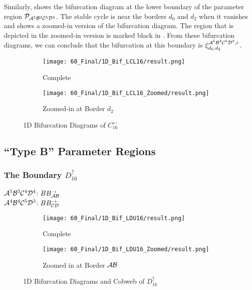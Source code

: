 Similarly,  shows the bifurcation diagram at the lower boundary of the parameter region $\mathcal{P}_{\mathcal{A}^5\mathcal{B}^3\mathcal{C}^5\mathcal{D}^3}$.
The stable cycle is near the borders $d_0$ and $d_2$ when it vanishes and  shows a zoomed-in version of the bifurcation diagram.
The region that is depicted in the zoomed-in version is marked black in .
From these bifurcation diagrams, we can conclude that the bifurcation at this boundary is $\xi_{d_0, d_2}^{\mathcal{A}^5\mathcal{B}^3\mathcal{C}^5\mathcal{D}^3, r}$.

\begin{figure}
    \centering
    \begin{subfigure}{0.4\textwidth}
        \centering
        \texttt{[image: 60\_Final/1D\_Bif\_LCL16/result.png]}
        \caption{Complete}
        \label{fig:final.bifurcation.C.left}
    \end{subfigure}
    \begin{subfigure}{0.4\textwidth}
        \centering
        \texttt{[image: 60\_Final/1D\_Bif\_LCL16\_Zoomed/result.png]}
        \caption{Zoomed-in at Border $d_2$}
        \label{fig:final.bifurcation.C.left.zoomed}
    \end{subfigure}
    \caption{1D Bifurcation Diagrams of $C_{16}^\leftarrow$}
\end{figure}

\subsection{``Type B'' Parameter Regions}

\subsubsection{The Boundary $D_{16}^\uparrow$}

$\mathcal{A}^5\mathcal{B}^3\mathcal{C}^4\mathcal{D}^4$: $BB_{\mathcal{A}\mathcal{B}}^\rightarrow$ \\
$\mathcal{A}^4\mathcal{B}^4\mathcal{C}^5\mathcal{D}^3$: $BB_{\mathcal{C}\mathcal{D}}^\rightarrow$

\begin{figure}
    \centering
    \begin{subfigure}{0.4\textwidth}
        \centering
        \texttt{[image: 60\_Final/1D\_Bif\_LDU16/result.png]}
        \caption{Complete}
        \label{fig:final.bifurcation.D.up}
    \end{subfigure}
    \begin{subfigure}{0.4\textwidth}
        \centering
        \texttt{[image: 60\_Final/1D\_Bif\_LDU16\_Zoomed/result.png]}
        \caption{Zoomed in at Border $\mathcal{A}\mathcal{B}$}
        \label{fig:final.bifurcation.D.up.zoomed}
    \end{subfigure}
    \caption{1D Bifurcation Diagrams and Cobweb of $D_{16}^\uparrow$}
\end{figure}

